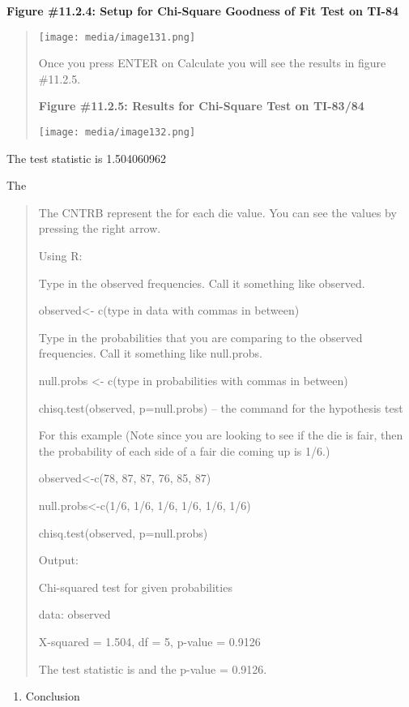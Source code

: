 \documentclass[]{book}
\providecommand{\tightlist}{%
  \setlength{\itemsep}{0pt}\setlength{\parskip}{0pt}}
\begin{document}
\textbf{Figure \#11.2.4: Setup for Chi-Square Goodness of Fit Test on TI-84}

\begin{quote}
\texttt{[image: media/image131.png]}

Once you press ENTER on Calculate you will see the results in figure \#11.2.5.

\textbf{Figure \#11.2.5: Results for Chi-Square Test on TI-83/84}

\texttt{[image: media/image132.png]}
\end{quote}

The test statistic is 1.504060962

The

\begin{quote}
The CNTRB represent the for each die value. You can see the values by pressing the right arrow.

Using R:

Type in the observed frequencies. Call it something like observed.

observed\textless{}- c(type in data with commas in between)

Type in the probabilities that you are comparing to the observed frequencies. Call it something like null.probs.

null.probs \textless{}- c(type in probabilities with commas in between)

chisq.test(observed, p=null.probs) -- the command for the hypothesis test

For this example (Note since you are looking to see if the die is fair, then the probability of each side of a fair die coming up is 1/6.)

observed\textless{}-c(78, 87, 87, 76, 85, 87)

null.probs\textless{}-c(1/6, 1/6, 1/6, 1/6, 1/6, 1/6)

chisq.test(observed, p=null.probs)

Output:

Chi-squared test for given probabilities

data: observed

X-squared = 1.504, df = 5, p-value = 0.9126

The test statistic is and the p-value = 0.9126.
\end{quote}

\begin{enumerate}
\def\labelenumi{\arabic{enumi}.}
\setcounter{enumi}{3}
\tightlist
\item
  Conclusion
\end{enumerate}
\end{document}

